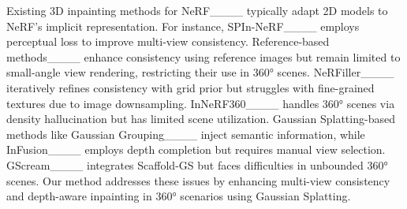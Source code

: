 \vspace{3pt}
Existing 3D inpainting methods for NeRF____ typically adapt 2D models to NeRF’s implicit representation. For instance, SPIn-NeRF____ employs perceptual loss to improve multi-view consistency. Reference-based methods____ enhance consistency using reference images but remain limited to small-angle view rendering, restricting their use in 360° scenes. NeRFiller____ iteratively refines consistency with grid prior but struggles with fine-grained textures due to image downsampling. InNeRF360____ handles 360° scenes via density hallucination but has limited scene utilization.
% 
Gaussian Splatting-based methods like Gaussian Grouping____ inject semantic information, while InFusion____ employs depth completion but requires manual view selection. GScream____ integrates Scaffold-GS but faces difficulties in unbounded 360° scenes. Our method addresses these issues by enhancing multi-view consistency and depth-aware inpainting in 360° scenarios using Gaussian Splatting.




